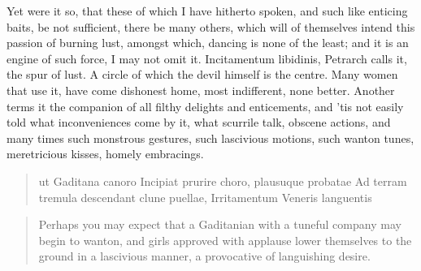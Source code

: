 Yet were it so, that these of which I have hitherto spoken, and such
like enticing baits, be not sufficient, there be many others, which
will of themselves intend this passion of burning lust, amongst which,
dancing is none of the least; and it is an engine of such force, I may
not omit it. Incitamentum libidinis, Petrarch calls it, the spur of
lust. A  circle of which the devil himself is the centre.
Many women that use it, have come dishonest home, most
indifferent, none better.  Another terms it the companion of all
filthy delights and enticements, and 'tis not easily told what
inconveniences come by it, what scurrile talk, obscene actions, and
many times such monstrous gestures, such lascivious motions, such
wanton tunes, meretricious kisses, homely embracings.

\begin{latin}
\begin{verse}
ut Gaditana canoro
Incipiat prurire choro, plausuque probatae
Ad terram tremula descendant clune puellae,
Irritamentum Veneris languentis
\end{verse}
\end{latin}
\translationrule%
\begin{verse}%
Perhaps you may expect that a Gaditanian
with a tuneful company may begin to wanton,
and girls approved with applause lower themselves
to the ground in a lascivious manner,
a provocative of languishing desire.
\end{verse}%

